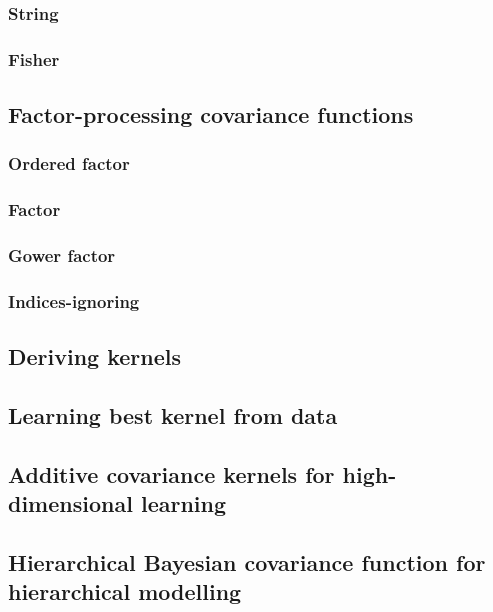 \documentclass[10pt]{article}
\begin{document}
\subsubsection{String}

\subsubsection{Fisher}


\subsection{Factor-processing covariance functions \cite{gaopro}}

\subsubsection{Ordered factor}

\subsubsection{Factor}

\subsubsection{Gower factor}

\subsubsection{Indices-ignoring}


\subsection{Deriving kernels \cite{deriving-kernels}}


\subsection{Learning best kernel from data \cite{choosing-kernels}}


\subsection{Additive covariance kernels for high-dimensional learning \cite{additive-kernels}}


\subsection{Hierarchical Bayesian covariance function for hierarchical modelling \cite{hierarchical-kernels}}
\end{document}
